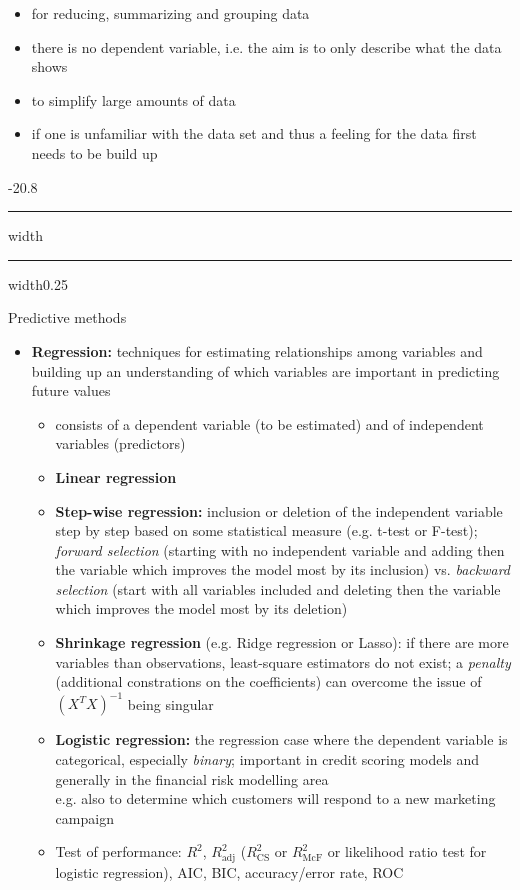 \documentclass[a4paper, landscape, 6pt, fleqn]{scrartcl}
\makeatletter
\renewcommand{\emph}[1]{\textbf{#1}}
\renewcommand{\subsection}{\@startsection{subsection}{1}{0mm}%
{-2\baselineskip}{0.8\baselineskip}%
{\hrule depth 0.2pt width\columnwidth\hrule depth0.75pt
width0.25\columnwidth\vspace*{1.2em}\large\bfseries}}
\makeatother
\begin{document}
\begin{multicols*}{4}
\begin{itemize}
\item for reducing, summarizing and grouping data
\item there is no dependent variable, i.e. the aim is to only describe what the data shows
\item to simplify large amounts of data
\item if one is unfamiliar with the data set and thus a feeling for the data first needs to be build up
\end{itemize}

\subsection{Predictive methods}

\begin{itemize}
\item \emph{Regression:} techniques for estimating relationships among variables and building up an understanding of which variables are important in predicting future values
\begin{itemize}
\item consists of a dependent variable (to be estimated) and of independent variables (predictors)
\item \emph{Linear regression}
\item \emph{Step-wise regression:} inclusion or deletion of the independent variable step by step based on some statistical measure (e.g. t-test or F-test); \textit{forward selection} (starting with no independent variable and adding then the variable which improves the model most by its inclusion) vs. \textit{backward selection} (start with all variables included and deleting then the variable which improves the model most by its deletion)
\item \emph{Shrinkage regression} (e.g. Ridge regression or Lasso): if there are more variables than observations, least-square estimators do not exist; a \textit{penalty} (additional constrations on the coefficients) can overcome the issue of $(X^T X)^{-1}$ being singular
\item \emph{Logistic regression:} the regression case where the dependent variable is categorical, especially \textit{binary}; important in credit scoring models and generally in the financial risk modelling area \\
e.g. also to determine which customers will respond to a new marketing campaign
\item Test of performance: $R^2$, $R^2_\text{adj}$ ($R^2_\text{CS}$ or $R^2_\text{McF}$ or likelihood ratio test for logistic regression), AIC, BIC, accuracy/error rate, ROC

\end{itemize}
\end{itemize}
\end{multicols*}
\end{document}
